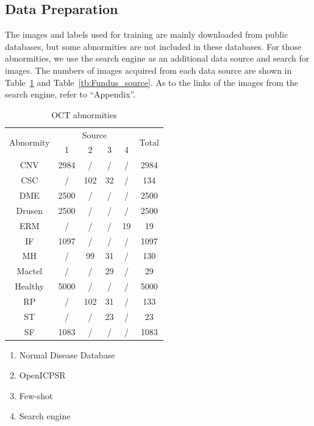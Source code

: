 \documentclass{article}
\begin{document}
	\subsection{Data Preparation}
	
	The images and labels used for training are mainly downloaded from public databases, but some abnormities are not included in these databases. For those abnormities, we use the search engine as an additional data source and search for images. The numbers of images acquired from each data source are shown in Table~\ref{tb:OCT_source} and Table~\ref{tb:Fundus_source}. As to the links of the images from the search engine, refer to ``Appendix''. 
	
	\begin{minipage}[t]{0.4\linewidth}
		{
			\fontsize{9}{12}\selectfont
			{
				\begin{longtable}{cccccc}
					\caption{OCT abnormities}
					\label{tb:OCT_source}\\
					\toprule
					\multirow{2}{*}{Abnormity}&\multicolumn{4}{c}{Source}&\multirow{2}{*}{Total}\\
					&1&2&3&4&\\
					\midrule
					CNV    &2984&/  &/ &/ &2984\\
					CSC    &/   &102&32&/ &134 \\
					DME    &2500&/  &/ &/ &2500\\
					Drusen &2500&/  &/ &/ &2500\\
					ERM    &/   &/  &/ &19&19  \\
					IF     &1097&/  &/ &/ &1097\\
					MH     &/   &99 &31&/ &130 \\
					Mactel &/   &/  &29&/ &29  \\
					Healthy&5000&/  &/ &/ &5000\\
					RP     &/   &102&31&/ &133 \\
					ST     &/   &/  &23&/ &23  \\
					SF     &1083&/  &/ &/ &1083\\
					\bottomrule
				\end{longtable}
				
				\vspace{0.5cm}
				\begin{enumerate}
					\item Normal Disease Database
					\vspace{-0.2cm}
					
					\item OpenICPSR
					\vspace{-0.2cm}
					
					\item Few-shot
					\vspace{-0.2cm}
					
					\item Search engine
					\vspace{-0.2cm}
				\end{enumerate}
				
				\vspace{0.5cm}
			}
		}
	\end{minipage}
\end{document}
